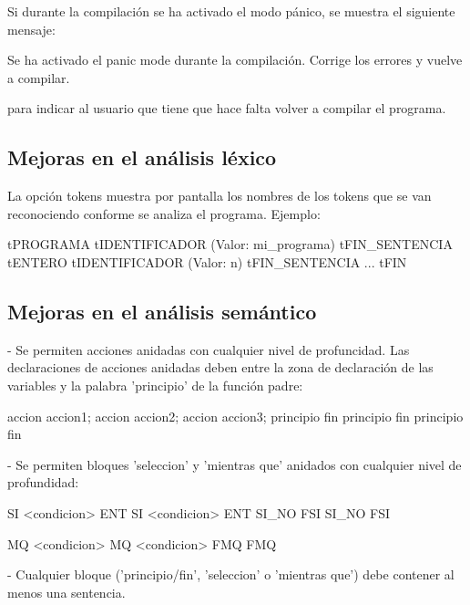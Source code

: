 \documentclass[../main.tex]{subfiles}
\begin{document}
Si durante la compilación se ha activado el modo pánico, se muestra el siguiente mensaje:
\begin{codigo}
Se ha activado el panic mode durante la compilación. Corrige los errores y vuelve a compilar.
\end{codigo}
para indicar al usuario que tiene que hace falta volver a compilar el programa.



\subsection{Mejoras en el análisis léxico}
La opción tokens muestra por pantalla los nombres de los tokens que se van reconociendo conforme se analiza el programa. Ejemplo:

\begin{codigo}
tPROGRAMA
tIDENTIFICADOR (Valor: mi_programa)
tFIN_SENTENCIA
tENTERO
tIDENTIFICADOR (Valor: n)
tFIN_SENTENCIA
...
tFIN
\end{codigo}

\subsection{Mejoras en el análisis semántico}
  - Se permiten acciones anidadas con cualquier nivel de profuncidad. Las declaraciones de acciones
    anidadas deben entre la zona de declaración de las variables y la palabra 'principio' de la
    función padre:

      accion accion1;
        accion accion2;
          accion accion3;
          principio
          fin
        principio
        fin
      principio
      fin

  - Se permiten bloques 'seleccion' y 'mientras que' anidados con cualquier nivel de profundidad:

      SI <condicion> ENT
        SI <condicion> ENT
        SI_NO
        FSI
      SI_NO
      FSI

      MQ <condicion>
        MQ <condicion>
        FMQ
      FMQ

  - Cualquier bloque ('principio/fin', 'seleccion' o 'mientras que') debe contener al menos una
    sentencia.
\end{document}
